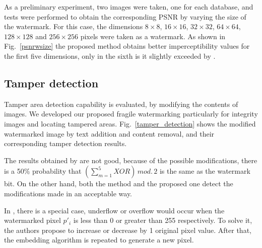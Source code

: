 \documentclass[runningheads]{llncs}
\begin{document}
As a preliminary experiment, two images were taken, one for each database, and tests were performed to obtain the corresponding PSNR by varying the size of the watermark. For this case, the dimensions $8\times 8$, $16\times 16$, $32\times 32$, $64\times 64$, $128\times 128$ and $256\times 256$ pixels were taken as a watermark. As shown in Fig.~\ref{psnrwsize} the proposed method obtains better imperceptibility values for the first five dimensions, only in the sixth is it slightly exceeded by \cite{shivani2017dual}.

\subsection{Tamper detection}
Tamper area detection capability is evaluated, by modifying the contents of images. We developed our proposed fragile watermarking particularly for integrity images and locating tampered areas. Fig.~\ref{tamper_detection} shows the modified watermarked image by text addition and content removal, and their corresponding tamper detection results.

The results obtained by \cite{shivani2017dual} are not good, because of the possible modifications, there is a 50\% probability that $\left( \sum_{m=1}^{5}XOR\right)\,  mod.\, 2$ is the same as the watermark bit. On the other hand, both the \cite{liu2018blind} method and the proposed one detect the modifications made in an acceptable way.

In \cite{liu2018blind}, there is a special case, underflow or overflow would occur when the watermarked pixel $p'_i$ is less than 0 or greater than 255 respectively. To solve it, the authors propose to increase or decrease by 1 original pixel value. After that, the embedding algorithm is repeated to generate a new pixel.
\end{document}
